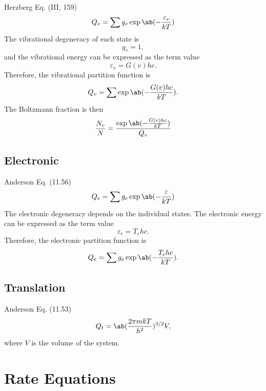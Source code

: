 \documentclass[11pt, twoside, fleqn]{report}
\begin{document}
Herzberg Eq. (III, 159)
\begin{equation*}
    Q_v = \sum g_v\exp\ab(-\frac{\varepsilon_v}{kT})
\end{equation*}
The vibrational degeneracy of each state is
\begin{equation*}
    g_v = 1,
\end{equation*}
and the vibrational energy can be expressed as the term value
\begin{equation*}
    \varepsilon_v = G(v)hc.
\end{equation*}
Therefore, the vibrational partition function is
\begin{equation*}
    Q_v = \sum \exp\ab(-\frac{G(v)hc}{kT}).
\end{equation*}
The Boltzmann fraction is then
\begin{equation*}
    \frac{N_v}{N} = \frac{\exp\ab(-\frac{G(v)hc}{kT})}{Q_v}
\end{equation*}

\subsection{Electronic}

Anderson Eq. (11.56)
\begin{equation*}
    Q_e = \sum g_e\exp\ab(-\frac{\varepsilon}{kT})
\end{equation*}
The electronic degeneracy depends on the individual states. The electronic energy can be expressed as the term value
\begin{equation*}
    \varepsilon_e = T_ehc.
\end{equation*}
Therefore, the electronic partition function is
\begin{equation*}
    Q_e = \sum g_e\exp\ab(-\frac{T_ehc}{kT}).
\end{equation*}

\subsection{Translation}

Anderson Eq. (11.53)
\begin{equation*}
    Q_t = \ab(\frac{2\pi mkT}{h^2})^{3/2}V,
\end{equation*}
where $V$ is the volume of the system.

\section{Rate Equations}
\end{document}
